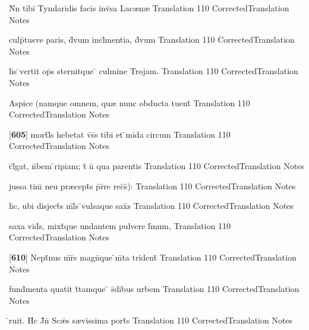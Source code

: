 \latline
  {N\={}n tibi Tyndaridis faci\={}s inv\={\macron {\i}}sa Lac{\ae}n{\ae}}
  { Translation }
  {110}
  { CorrectedTranslation }
  { Notes }


\latline
  {culp\={}tusve paris, d\={\macron {\i}}vum incl\={}mentia, d\={\macron {\i}}vum}
  { Translation }
  {110}
  { CorrectedTranslation }
  { Notes }


\latline
  {h\={}s \={}vertit op\={}s sternitque \={} culmine Trojam.}
  { Translation }
  {110}
  { CorrectedTranslation }
  { Notes }


\latline
  {Aspice (namque omnem, qu{\ae} nunc obducta tuent\={\macron {\i}}}
  { Translation }
  {110}
  { CorrectedTranslation }
  { Notes }


\latline
  {[\textbf{605}] mort\={}l\={\macron {\i}}s hebetat v\={\macron {\i}}s\={}s tibi et \={}mida circum}
  { Translation }
  {110}
  { CorrectedTranslation }
  { Notes }


\latline
  {c\={}l\={\macron {\i}}gat, n\={}bem \={}ripiam; t\={} n\={} qua parentis}
  { Translation }
  {110}
  { CorrectedTranslation }
  { Notes }


\latline
  {jussa tim\={} neu pr{\ae}cept\={\macron {\i}}s p\={}r\={}re rec\={}s\={}):}
  { Translation }
  {110}
  { CorrectedTranslation }
  { Notes }


\latline
  {h\={\macron {\i}}c, ubi disject\={}s m\={}l\={}s \={}vulsaque sax\={\macron {\i}}s}
  { Translation }
  {110}
  { CorrectedTranslation }
  { Notes }


\latline
  {saxa vid\={}s, mixt\={}que undantem pulvere f\={}mum,}
  { Translation }
  {110}
  { CorrectedTranslation }
  { Notes }


\latline
  {[\textbf{610}] Nept\={}nus m\={}r\={}s magn\={}que \={}m\={}ta trident\={\macron {\i}}}
  { Translation }
  {110}
  { CorrectedTranslation }
  { Notes }


\latline
  {fund\={}menta quatit t\={}tamque \={} s\={}dibus urbem}
  { Translation }
  {110}
  { CorrectedTranslation }
  { Notes }


\latline
  {\={}ruit.  H\={\macron {\i}}c J\={}n\={} Sc{\ae}\={}s s{\ae}vissima port\={}s}
  { Translation }
  {110}
  { CorrectedTranslation }
  { Notes }


